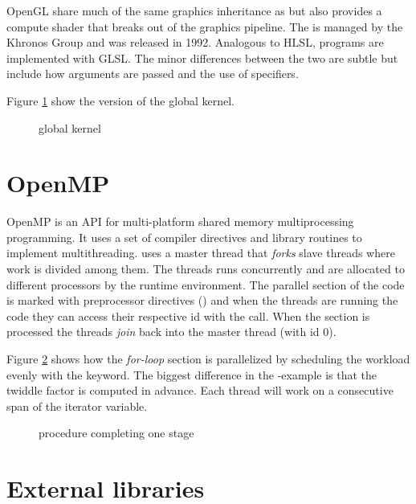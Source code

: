 \gls{OpenGL} share much of the same graphics inheritance as {\DX} but also provides a compute shader that breaks out of the graphics pipeline. The {\GL} is managed by the Khronos Group and was released in 1992. Analogous to \gls{HLSL}, {\GL} programs are implemented with \gls{GLSL}. The minor differences between the two are subtle but include how arguments are passed and the use of specifiers.

Figure \ref{lst:sample:global:gl} show the {\GL} version of the global kernel.

\begin{figure}
	\centering
	\fbox{}
	\caption{{\GL} global kernel}
	\label{lst:sample:global:gl}	
\end{figure}

\section{OpenMP}

\gls{OpenMP} is an \gls{API} for multi-platform shared memory multiprocessing programming. It uses a set of compiler directives and library routines to implement multithreading. {\OMP} uses a master thread that \emph{forks} slave threads where work is divided among them. The threads runs concurrently and are allocated to different processors by the runtime environment. The parallel section of the code is marked with preprocessor directives () and when the threads are running the code they can access their respective id with the  call. When the section is processed the threads \emph{join} back into the master thread (with id $0$).

Figure \ref{lst:sample:global:omp} shows how the \emph{for-loop} section is parallelized by scheduling the workload evenly with the  keyword. The biggest difference in the {\OMP}-example is that the twiddle factor is computed in advance. Each thread will work on a consecutive span of the iterator variable.

\begin{figure}
	\centering
	\fbox{}%
	\caption{{\OMP} procedure completing one stage}%
	\label{lst:sample:global:omp}%
\end{figure}%

\section{External libraries}


